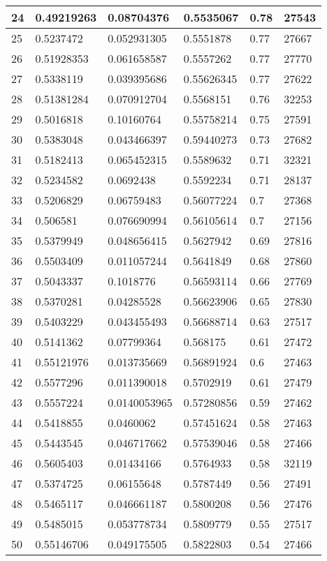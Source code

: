 \begin{longtable}{|l|l|l|l|l|l|}
24 & 0.49219263 & 0.08704376 & 0.5535067 & 0.78 & 27543 \\ \hline 
25 & 0.5237472 & 0.052931305 & 0.5551878 & 0.77 & 27667 \\ \hline 
26 & 0.51928353 & 0.061658587 & 0.5557262 & 0.77 & 27770 \\ \hline 
27 & 0.5338119 & 0.039395686 & 0.55626345 & 0.77 & 27622 \\ \hline 
28 & 0.51381284 & 0.070912704 & 0.5568151 & 0.76 & 32253 \\ \hline 
29 & 0.5016818 & 0.10160764 & 0.55758214 & 0.75 & 27591 \\ \hline 
30 & 0.5383048 & 0.043466397 & 0.59440273 & 0.73 & 27682 \\ \hline 
31 & 0.5182413 & 0.065452315 & 0.5589632 & 0.71 & 32321 \\ \hline 
32 & 0.5234582 & 0.0692438 & 0.5592234 & 0.71 & 28137 \\ \hline 
33 & 0.5206829 & 0.06759483 & 0.56077224 & 0.7 & 27368 \\ \hline 
34 & 0.506581 & 0.076690994 & 0.56105614 & 0.7 & 27156 \\ \hline 
35 & 0.5379949 & 0.048656415 & 0.5627942 & 0.69 & 27816 \\ \hline 
36 & 0.5503409 & 0.011057244 & 0.5641849 & 0.68 & 27860 \\ \hline 
37 & 0.5043337 & 0.1018776 & 0.56593114 & 0.66 & 27769 \\ \hline 
38 & 0.5370281 & 0.04285528 & 0.56623906 & 0.65 & 27830 \\ \hline 
39 & 0.5403229 & 0.043455493 & 0.56688714 & 0.63 & 27517 \\ \hline 
40 & 0.5141362 & 0.07799364 & 0.568175 & 0.61 & 27472 \\ \hline 
41 & 0.55121976 & 0.013735669 & 0.56891924 & 0.6 & 27463 \\ \hline 
42 & 0.5577296 & 0.011390018 & 0.5702919 & 0.61 & 27479 \\ \hline 
43 & 0.5557224 & 0.0140053965 & 0.57280856 & 0.59 & 27462 \\ \hline 
44 & 0.5418855 & 0.0460062 & 0.57451624 & 0.58 & 27463 \\ \hline 
45 & 0.5443545 & 0.046717662 & 0.57539046 & 0.58 & 27466 \\ \hline 
46 & 0.5605403 & 0.01434166 & 0.5764933 & 0.58 & 32119 \\ \hline 
47 & 0.5374725 & 0.06155648 & 0.5787449 & 0.56 & 27491 \\ \hline 
48 & 0.5465117 & 0.046661187 & 0.5800208 & 0.56 & 27476 \\ \hline 
49 & 0.5485015 & 0.053778734 & 0.5809779 & 0.55 & 27517 \\ \hline 
50 & 0.55146706 & 0.049175505 & 0.5822803 & 0.54 & 27466 \\ \hline 
\end{longtable}